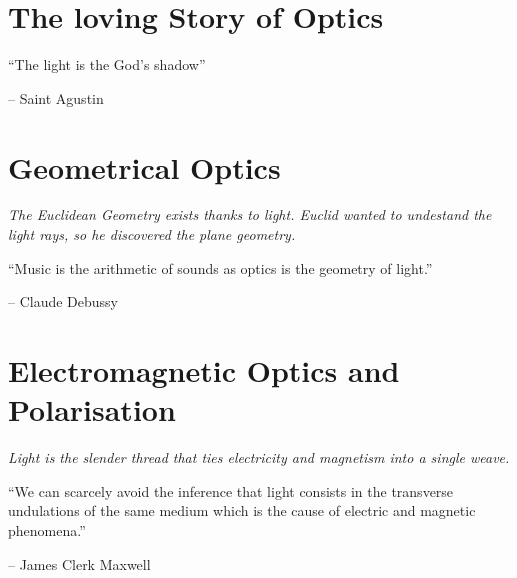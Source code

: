 \documentclass[spanish,11pt,twoside,openright]{book}
\begin{document}
	\hypersetup{pageanchor=true}

	\tableofcontents
	\listoffigures
	
	\mainmatter
	
	
    
	\chapter{The loving Story of Optics}
	\thispagestyle{empty}
	\vspace*{2cm}
	\begin{center}
		{\itshape\Huge \par}
		\vspace{1cm}
		\epigraph{``The light is the God's shadow''}{-- Saint Agustin}
	\end{center}
	\clearpage
	
	
	
	\chapter{Geometrical Optics}
	\thispagestyle{empty}
	\vspace*{2cm}
	\begin{center}
		{\itshape\Huge The Euclidean Geometry exists thanks to light. Euclid wanted to undestand the light rays, so he discovered the plane geometry. \par}
		\vspace{1cm}
		\epigraph{``Music is the arithmetic of sounds as optics is the geometry of light.''}{-- Claude Debussy}
	\end{center}
	\clearpage
	
	

	\chapter{Electromagnetic Optics and Polarisation}
	\thispagestyle{empty}
	\vspace*{2cm}
	\begin{center}
		{\itshape\Huge Light is the slender thread that ties electricity and magnetism into a single weave. \par}
		\vspace{1cm}
		\epigraph{``We can scarcely avoid the inference that light consists in the transverse undulations of the same medium which is the cause of electric and magnetic phenomena.''}{-- James Clerk Maxwell}
	\end{center}
	\clearpage
\end{document}
